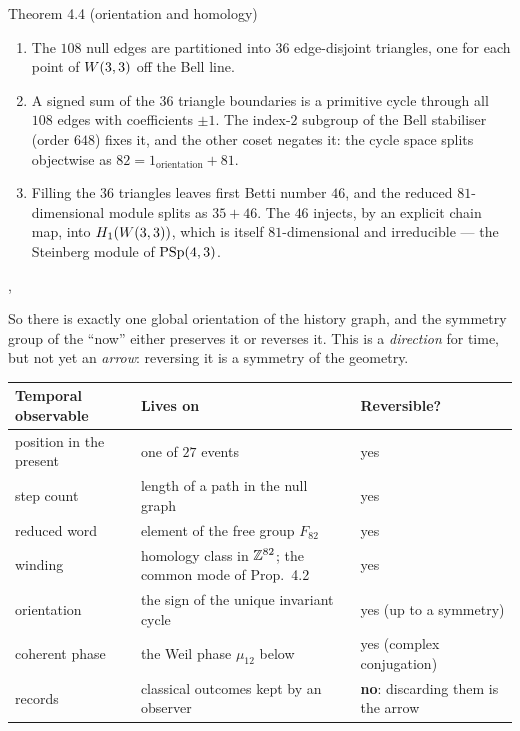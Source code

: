 \begin{result}{Theorem 4.4 (orientation and homology) \hfill \tierC}
\begin{enumerate}[label=(\roman*),leftmargin=1.5em]
\item The $108$ null edges are partitioned into $36$ edge-disjoint triangles, one for
      each point of $W(3,3)$ off the Bell line.
\item A signed sum of the $36$ triangle boundaries is a primitive cycle through all $108$
      edges with coefficients $\pm1$. The index-$2$ subgroup of the Bell stabiliser
      (order $648$) fixes it, and the other coset negates it: the cycle space splits
      objectwise as $82=1_{\text{orientation}}+81$.
\item Filling the $36$ triangles leaves first Betti number $46$, and the reduced
      $81$-dimensional module splits as $35+46$. The $46$ injects, by an explicit chain
      map, into $H_1(W(3,3))$, which is itself $81$-dimensional and irreducible --- the
      Steinberg module of $\mathrm{PSp}(4,3)$.
\end{enumerate}
, 
\end{result}

So there is exactly one global orientation of the history graph, and the symmetry group
of the ``now'' either preserves it or reverses it. This is a \emph{direction} for time,
but not yet an \emph{arrow}: reversing it is a symmetry of the geometry.

\begin{center}
\small
\renewcommand{\arraystretch}{1.25}
\begin{tabularx}{\textwidth}{@{}>{\raggedright\arraybackslash}p{3.5cm}X>{\raggedright\arraybackslash}p{3.3cm}@{}}
\toprule
\textbf{Temporal observable} & \textbf{Lives on} & \textbf{Reversible?}\\
\midrule
position in the present & one of $27$ events & yes\\
step count & length of a path in the null graph & yes\\
reduced word & element of the free group $F_{82}$ & yes\\
winding & homology class in $\mathbb{Z}^{82}$; the common mode of Prop.~4.2 & yes\\
orientation & the sign of the unique invariant cycle & yes (up to a symmetry)\\
coherent phase & the Weil phase $\mu_{12}$ below & yes (complex conjugation)\\
records & classical outcomes kept by an observer & \textbf{no}: discarding them is the arrow\\
\bottomrule
\end{tabularx}
\end{center}

